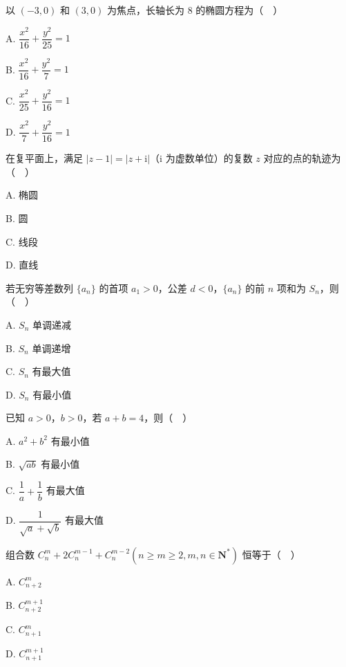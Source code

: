 \begin{question}
以 \((-3,0)\) 和 \((3,0)\) 为焦点，长轴长为 8 的椭圆方程为（　）

A. \(\dfrac{x^{2}}{16}+\dfrac{y^{2}}{25}=1\)

B. \(\dfrac{x^{2}}{16}+\dfrac{y^{2}}{7}=1\)

C. \(\dfrac{x^{2}}{25}+\dfrac{y^{2}}{16}=1\)

D. \(\dfrac{x^{2}}{7}+\dfrac{y^{2}}{16}=1\)

\end{question}
\begin{question}
在复平面上，满足 \(|z-1|=|z+\mathrm{i}|\)（\(\mathrm{i}\) 为虚数单位）的复数 \(z\) 对应的点的轨迹为（　）

A. 椭圆

B. 圆

C. 线段

D. 直线

\end{question}
\begin{question}
若无穷等差数列 \(\{a_{n}\}\) 的首项 \(a_{1}>0\)，公差 \(d<0\)，\(\{a_{n}\}\) 的前 \(n\) 项和为 \(S_{n}\)，则（　）

A. \(S_{n}\) 单调递减

B. \(S_{n}\) 单调递增

C. \(S_{n}\) 有最大值

D. \(S_{n}\) 有最小值

\end{question}
\begin{question}
已知 \(a>0\)，\(b>0\)，若 \(a+b=4\)，则（　）

A. \(a^{2}+b^{2}\) 有最小值

B. \(\sqrt{ab}\) 有最小值

C. \(\dfrac{1}{a}+\dfrac{1}{b}\) 有最大值

D. \(\dfrac{1}{\sqrt{a}+\sqrt{b}}\) 有最大值

\end{question}
\begin{question}
组合数 \(C_{n}^{m}+2C_{n}^{m-1}+C_{n}^{m-2}\left(n\geqslant m\geqslant 2,m,n\in\mathbf{N}^{*}\right)\) 恒等于（　）

A. \(C_{n+2}^{m}\)

B. \(C_{n+2}^{m+1}\)

C. \(C_{n+1}^{m}\)

D. \(C_{n+1}^{m+1}\)

\end{question}
